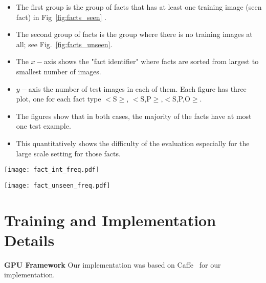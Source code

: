 \documentclass[runningheads]{llncs}
\begin{document}
\begin{itemize}
	\item The first group is the group of facts that has at least one training image (seen fact) in Fig~\ref{fig:facts_seen} .
\item The second group of facts is the group where there is no training images at all; see Fig.~\ref{fig:facts_unseen}.
\item The $x-$axis  shows the "fact identifier" where facts are sorted from largest to smallest number of images.
\item $y-$axis the number of test images in each of them. Each figure has three plot, one for each fact type $<$S$\ge$, $<$S,P$\ge$,$<$S,P,O$\ge$.
\item The figures show that  in both cases, the majority of the facts have at most one test example.
\item This quantitatively shows the difficulty of the evaluation especially for the large scale setting for those facts.
\end{itemize}














\begin{figure*}[ht!]
  \centering
    \texttt{[image: fact\_int\_freq.pdf]}


     \caption{26,740 unique test facts that have at least one training example (seen facts), total of 136,040  images ($x-$ axis shows these facts, $y-$ axis shows the number of test images per each fact)}
     \label{fig:facts_seen}
\end{figure*}
\begin{figure*}[ht!]
  \centering
    \texttt{[image: fact\_unseen\_freq.pdf]}
     \caption{31,677 unique unseen test facts, total of 32,651 images ($x-$ axis shows  these facts, $y-$ axis shows the number of test images per each fact)}
     \label{fig:facts_unseen}
\end{figure*}
















\clearpage
\section{Training and Implementation Details}
\textbf{GPU Framework} Our implementation was based on Caffe~\cite{jia2014caffe} for our implementation.
\end{document}
